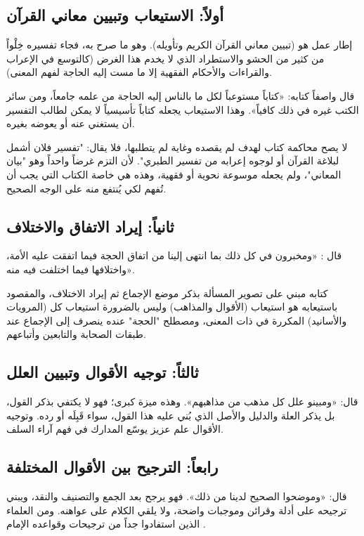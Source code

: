 \subsection{أولاً: الاستيعاب وتبيين معاني القرآن}
إطار عمل  هو (تبيين معاني القرآن الكريم وتأويله). وهو ما صرح به، فجاء تفسيره خِلْواً من كثير من الحشو والاستطراد الذي لا يخدم هذا الغرض (كالتوسع في الإعراب والقراءات والأحكام الفقهية إلا ما مست إليه الحاجة لفهم المعنى). 

قال واصفاً كتابه: «كتاباً مستوعباً لكل ما بالناس إليه الحاجة من علمه جامعاً، ومن سائر الكتب غيره في ذلك كافياً». وهذا الاستيعاب يجعله كتاباً تأسيسياً لا يمكن لطالب التفسير أن يستغني عنه أو يعوضه بغيره. 

\begin{fawaid}
لا يصح محاكمة كتاب لهدف لم يقصده وغاية لم يتطلبها، فلا يقال: "تفسير فلان أشمل لبلاغة القرآن أو لوجوه إعرابه من تفسير الطبري". لأن  التزم غرضاً واحداً وهو "بيان المعاني"، ولم يجعله موسوعة نحوية أو فقهية، وهذه هي خاصة الكتاب التي يجب أن تُفهم لكي يُنتفع منه على الوجه الصحيح.
\end{fawaid}

\subsection{ثانياً: إيراد الاتفاق والاختلاف}
قال : «ومخبرون في كل ذلك بما انتهى إلينا من اتفاق الحجة فيما اتفقت عليه الأمة، واختلافها فيما اختلفت فيه منه». 

كتابه مبني على تصوير المسألة بذكر موضع الإجماع ثم إيراد الاختلاف، والمقصود باستيعابه هو استيعاب (الأقوال والمذاهب) وليس بالضرورة استيعاب كل (المرويات والأسانيد) المكررة في ذات المعنى، ومصطلح "الحجة" عنده ينصرف إلى الإجماع عند طبقات الصحابة والتابعين وأتباعهم.

\subsection{ثالثاً: توجيه الأقوال وتبيين العلل}
قال: «ومبينو علل كل مذهب من مذاهبهم». وهذه ميزة كبرى؛ فهو لا يكتفي بذكر القول، بل يذكر العلة والدليل والأصل الذي بُني عليه هذا القول، سواء قَبِلَه أو رده. وتوجيه الأقوال علم عزيز يوسّع المدارك في فهم آراء السلف.

\subsection{رابعاً: الترجيح بين الأقوال المختلفة}
قال: «وموضحوا الصحيح لدينا من ذلك». فهو يرجح بعد الجمع والتصنيف والنقد، ويبني ترجيحه على أدلة وقرائن وموجبات واضحة، ولا يلقي الكلام على عواهنه. ومن العلماء الذين استفادوا جداً من ترجيحات  وقواعده الإمام .


